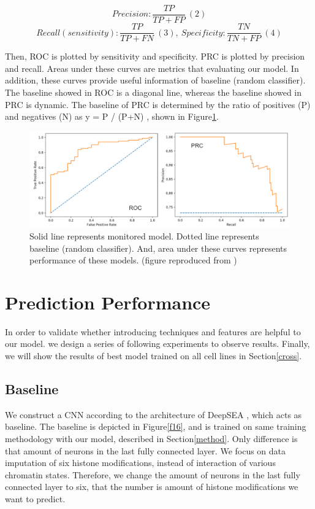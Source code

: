 \vspace{-1cm}
\[Precision : \frac{TP}{TP+FP}\ (2)\]
\[Recall(sensitivity) : \frac{TP}{TP+FN}\ (3),\ Specificity : \frac{TN}{TN+FP}\ (4)\]

Then, ROC is plotted by sensitivity and specificity. PRC is plotted by precision and recall. Areas under these curves are metrics that evaluating our model. In addition, these curves provide useful information of baseline (random classifier). The baseline showed in ROC is a diagonal line, whereas the baseline showed in PRC is dynamic. The baseline of PRC is determined by the ratio of positives (P) and negatives (N) as y = P / (P+N) \cite{saito2015precision}, shown in Figure\ref{f15}.

\begin{figure}[H]
    \centering
    \includegraphics[width=1\columnwidth]{body/figure/figure15.png}
    \vspace{-1cm}
    \captionsetup{labelfont=bf}
    \renewcommand{\baselinestretch}{1.0}
    \caption[ROC and PRC]{Solid line represents monitored model. Dotted line represents baseline (random classifier). And, area under these curves represents performance of these models. (figure reproduced from \cite{rocprc})}
    \label{f15}
\end{figure}

\section{Prediction Performance} \label{performance}
In order to validate whether introducing techniques and features are helpful to our model. we design a series of following experiments to observe results. Finally, we will show the results of best model trained on all cell lines in Section\ref{cross}.

\subsection{Baseline}
We construct a CNN according to the architecture of DeepSEA \cite{zhou2015predicting}, which acts as baseline. The baseline is depicted in Figure\ref{f16}, and is trained on same training methodology with our model, described in Section\ref{method}. Only difference is that amount of neurons in the last fully connected layer. We focus on data imputation of six histone modifications, instead of interaction of various chromatin states. Therefore, we change the amount of neurons in the last fully connected layer to six, that the number is amount of histone modifications we want to predict.

